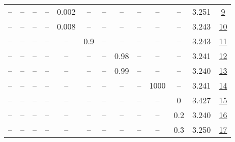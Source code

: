 \begin{table}[H]
\begin{tabular}{ccccccccccccc}
-- & -- & -- & -- & 0.002 & -- & -- & -- & -- & -- & -- & 3.251 & \href{https://wandb.ai/stanford-mercury/optimizer-scaling/runs/sweep-130m-21B-mudamv1879fblr0.002-alr0.004-wd0.1-minlr0-warmup5-8adb03}{9} \\
-- & -- & -- & -- & 0.008 & -- & -- & -- & -- & -- & -- & 3.243 & \href{https://wandb.ai/stanford-mercury/optimizer-scaling/runs/sweep-130m-21B-mudamvef4176lr0.008-alr0.004-wd0.1-minlr0-warmup5-e23d39}{10} \\
-- & -- & -- & -- & -- & 0.9 & -- & -- & -- & -- & -- & 3.243 & \href{https://wandb.ai/stanford-mercury/optimizer-scaling/runs/sweep-130m-21B-mudamvc4d759lr0.004-alr0.004-wd0.1-minlr0-warmup5-efbc12}{11} \\
-- & -- & -- & -- & -- & -- & -- & 0.98 & -- & -- & -- & 3.241 & \href{https://wandb.ai/stanford-mercury/optimizer-scaling/runs/sweep-130m-21B-mudamv628ceflr0.004-alr0.004-wd0.1-minlr0-warmup5-c65cf8}{12} \\
-- & -- & -- & -- & -- & -- & -- & 0.99 & -- & -- & -- & 3.240 & \href{https://wandb.ai/stanford-mercury/optimizer-scaling/runs/sweep-130m-21B-mudamv1f7123lr0.004-alr0.004-wd0.1-minlr0-warmup5-e84f38}{13} \\
-- & -- & -- & -- & -- & -- & -- & -- & -- & 1000 & -- & 3.241 & \href{https://wandb.ai/stanford-mercury/optimizer-scaling/runs/sweep-130m-21B-mudamv47da80lr0.004-alr0.004-wd0.1-minlr0-warmup1-a616b0}{14} \\
-- & -- & -- & -- & -- & -- & -- & -- & -- & -- & 0 & 3.427 & \href{https://wandb.ai/stanford-mercury/optimizer-scaling/runs/sweep-130m-21B-mudamk66cc82lr0.004-alr0.004-wd0-minlr0-warmup500-12e466}{15} \\
-- & -- & -- & -- & -- & -- & -- & -- & -- & -- & 0.2 & 3.240 & \href{https://wandb.ai/stanford-mercury/optimizer-scaling/runs/sweep-130m-21B-mudamk117648lr0.004-alr0.004-wd0.2-minlr0-warmup5-a63661}{16} \\
-- & -- & -- & -- & -- & -- & -- & -- & -- & -- & 0.3 & 3.250 & \href{https://wandb.ai/stanford-mercury/optimizer-scaling/runs/sweep-130m-21B-mudamk32cfe1lr0.004-alr0.004-wd0.3-minlr0-warmup5-6bc863}{17} \\
\bottomrule
\end{tabular}
\end{table}

